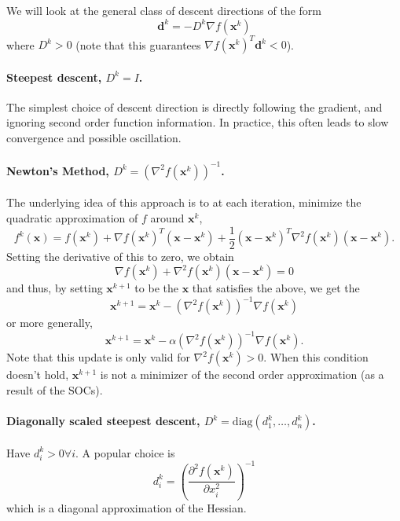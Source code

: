We will look at the general class of descent directions of the form 
\begin{equation}
    \bm{d}^k = -D^k \nabla f(\bm{x}^k)
\end{equation}
where $D^k > 0$ (note that this guarantees $\nabla f(\bm{x}^k)^T \bm{d}^k < 0$). 

\paragraph{Steepest descent, $D^k = I$.} The simplest choice of descent direction is directly following the gradient, and ignoring second order function information. In practice, this often leads to slow convergence and possible oscillation.

\paragraph{Newton's Method, $D^k = (\nabla^2 f(\bm{x}^k))^{-1}$.} The underlying idea of this approach is to at each iteration, minimize the quadratic approximation of $f$ around $\bm{x}^k$,
\begin{equation}
    f^k(\bm{x}) = f(\bm{x}^k) + \nabla f(\bm{x}^k)^T (\bm{x} - \bm{x}^k) + \frac{1}{2} (\bm{x} - \bm{x}^k)^T \nabla^2 f(\bm{x}^k) (\bm{x} - \bm{x}^k).
\end{equation}
Setting the derivative of this to zero, we obtain 
\begin{equation}
    \nabla f(\bm{x}^k) + \nabla^2 f(\bm{x}^k) (\bm{x} - \bm{x}^k) = 0
\end{equation}
and thus, by setting $\bm{x}^{k+1}$ to be the $\bm{x}$ that satisfies the above, we get the
\begin{equation}
    \bm{x}^{k+1} = \bm{x}^k - (\nabla^2 f(\bm{x}^k))^{-1} \nabla f(\bm{x}^k)
\end{equation}
or more generally, 
\begin{equation}
    \bm{x}^{k+1} = \bm{x}^k - \alpha (\nabla^2 f(\bm{x}^k))^{-1} \nabla f(\bm{x}^k).
\end{equation}
Note that this update is only valid for $\nabla^2 f(\bm{x}^k) > 0$. When this condition doesn't hold, $\bm{x}^{k+1}$ is not a minimizer of the second order approximation (as a result of the SOCs). 

\paragraph{Diagonally scaled steepest descent, $D^k = \textrm{diag}(d_1^k, \ldots, d_n^k)$.} Have $d_i^k >0 \forall i$. A popular choice is 
\begin{equation}
    d_i^k = \left( \frac{\partial^2 f(\bm{x}^k)}{\partial x_i^2} \right)^{-1}
\end{equation}
which is a diagonal approximation of the Hessian. 

